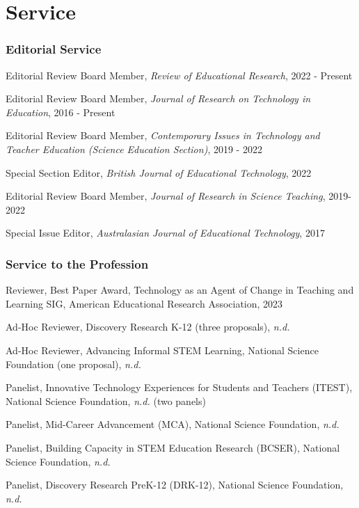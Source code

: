 \documentclass[
  14,
]{article}
\begin{document}
\hypertarget{service}{%
\section{Service}\label{service}}

\hypertarget{editorial-service}{%
\subsubsection{Editorial Service}\label{editorial-service}}

Editorial Review Board Member, \emph{Review of Educational Research},
2022 - Present

Editorial Review Board Member, \emph{Journal of Research on Technology
in Education}, 2016 - Present

Editorial Review Board Member, \emph{Contemporary Issues in Technology
and Teacher Education (Science Education Section)}, 2019 - 2022

Special Section Editor, \emph{British Journal of Educational
Technology}, 2022

Editorial Review Board Member, \emph{Journal of Research in Science
Teaching}, 2019-2022

Special Issue Editor, \emph{Australasian Journal of Educational
Technology}, 2017

\hypertarget{service-to-the-profession}{%
\subsubsection{Service to the
Profession}\label{service-to-the-profession}}

Reviewer, Best Paper Award, Technology as an Agent of Change in Teaching
and Learning SIG, American Educational Research Association, 2023

Ad-Hoc Reviewer, Discovery Research K-12 (three proposals), \emph{n.d.}

Ad-Hoc Reviewer, Advancing Informal STEM Learning, National Science
Foundation (one proposal), \emph{n.d.}

Panelist, Innovative Technology Experiences for Students and Teachers
(ITEST), National Science Foundation, \emph{n.d.} (two panels)

Panelist, Mid-Career Advancement (MCA), National Science Foundation,
\emph{n.d.}

Panelist, Building Capacity in STEM Education Research (BCSER), National
Science Foundation, \emph{n.d.}

Panelist, Discovery Research PreK-12 (DRK-12), National Science
Foundation, \emph{n.d.}
\end{document}
